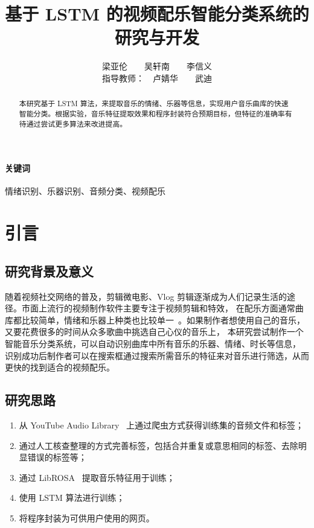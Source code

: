 \documentclass[a4paper,utf8,10pt]{article}
\title{基于 LSTM 的视频配乐智能分类系统的研究与开发}
\author{梁亚伦　　吴轩南　　李信义 \\ 指导教师：　卢婧华　　武迪}
\affil{中国人民大学附属中学　　北京　　100080}
\date{}
\newcommand{\sept}{\setlength\itemsep{-4pt}}
\begin{document}
\maketitle

\begin{abstract}
本研究基于 LSTM 算法，来提取音乐的情绪、乐器等信息，实现用户音乐曲库的快速智能分类。根据实验，音乐特征提取效果和程序封装符合预期目标，但特征的准确率有待通过尝试更多算法来改进提高。
\end{abstract}

\paragraph{关键词} 情绪识别、乐器识别、音频分类、视频配乐
\vspace{\baselineskip}

\section{引言}

\subsection{研究背景及意义}

随着视频社交网络的普及，剪辑微电影、Vlog 剪辑逐渐成为人们记录生活的途径。市面上流行的视频制作软件主要专注于视频剪辑和特效，
在配乐方面通常曲库都比较简单，情绪和乐器上种类也比较单一~\cite{boixx14}。如果制作者想使用自己的音乐，又要花费很多的时间从众多歌曲中挑选自己心仪的音乐上，
本研究尝试制作一个智能音乐分类系统，可以自动识别曲库中所有音乐的乐器、情绪、时长等信息，
识别成功后制作者可以在搜索框通过搜索所需音乐的特征来对音乐进行筛选，从而更快的找到适合的视频配乐。

\subsection{研究思路}

\begin{enumerate}
  \sept
  \item 从 YouTube Audio Library~\cite{yal} 上通过爬虫方式获得训练集的音频文件和标签；
  \item 通过人工核查整理的方式完善标签，包括合并重复或意思相同的标签、去除明显错误的标签等；
  \item 通过 LibROSA~\cite{librosa18} 提取音乐特征用于训练；
  \item 使用 LSTM 算法进行训练；
  \item 将程序封装为可供用户使用的网页。
\end{enumerate}
\end{document}
